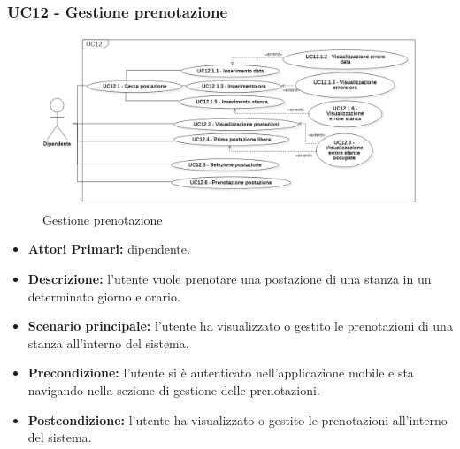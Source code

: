 \subsubsection{ UC12 - Gestione prenotazione }
\begin{figure}[H]
	\centering
	\includegraphics[width=18cm]{res/images/UC12.png}
	\caption{Gestione prenotazione}
	\label{fig:Gestione prenotazione}
\end{figure}
\begin{itemize}
	\item\textbf{Attori Primari:} dipendente.
	\item\textbf{Descrizione:} l’utente vuole prenotare una postazione di una stanza in un determinato giorno e orario.
	\item\textbf{Scenario principale:} l’utente ha visualizzato o gestito le prenotazioni di una stanza all’interno del sistema.
	\item\textbf{Precondizione:} l’utente si è autenticato nell'applicazione mobile e sta navigando nella sezione di gestione delle prenotazioni.
	\item\textbf{Postcondizione:} l’utente ha visualizzato o gestito le prenotazioni all’interno del sistema.
\end{itemize}

